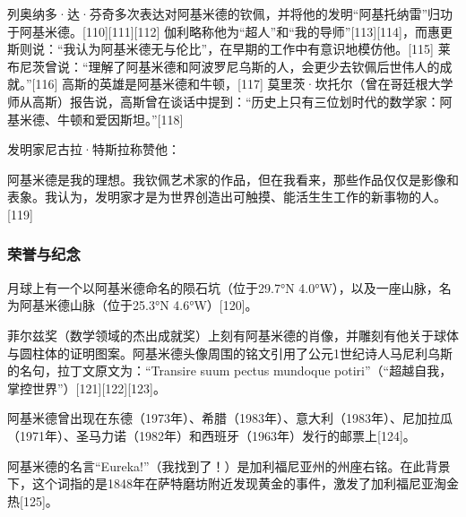 列奥纳多·达·芬奇多次表达对阿基米德的钦佩，并将他的发明“阿基托纳雷”归功于阿基米德。[110][111][112] 伽利略称他为“超人”和“我的导师”[113][114]，而惠更斯则说：“我认为阿基米德无与伦比”，在早期的工作中有意识地模仿他。[115] 莱布尼茨曾说：“理解了阿基米德和阿波罗尼乌斯的人，会更少去钦佩后世伟人的成就。”[116] 高斯的英雄是阿基米德和牛顿，[117] 莫里茨·坎托尔（曾在哥廷根大学师从高斯）报告说，高斯曾在谈话中提到：“历史上只有三位划时代的数学家：阿基米德、牛顿和爱因斯坦。”[118]

发明家尼古拉·特斯拉称赞他：

阿基米德是我的理想。我钦佩艺术家的作品，但在我看来，那些作品仅仅是影像和表象。我认为，发明家才是为世界创造出可触摸、能活生生工作的新事物的人。[119]
\subsubsection{荣誉与纪念}
月球上有一个以阿基米德命名的陨石坑（位于29.7°N 4.0°W），以及一座山脉，名为阿基米德山脉（位于25.3°N 4.6°W）[120]。

菲尔兹奖（数学领域的杰出成就奖）上刻有阿基米德的肖像，并雕刻有他关于球体与圆柱体的证明图案。阿基米德头像周围的铭文引用了公元1世纪诗人马尼利乌斯的名句，拉丁文原文为：“Transire suum pectus mundoque potiri”（“超越自我，掌控世界”）[121][122][123]。

阿基米德曾出现在东德（1973年）、希腊（1983年）、意大利（1983年）、尼加拉瓜（1971年）、圣马力诺（1982年）和西班牙（1963年）发行的邮票上[124]。

阿基米德的名言“Eureka!”（我找到了！）是加利福尼亚州的州座右铭。在此背景下，这个词指的是1848年在萨特磨坊附近发现黄金的事件，激发了加利福尼亚淘金热[125]。